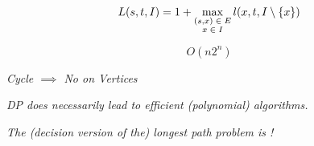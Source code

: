\begin{frame}{}
  \[
    L(s, t, I) = 1 + \max_{\substack{(s, x) \;\in\; E \\ x \;\in\; I}} l(x, t, I \setminus \left\{x\right\})
  \]

  \pause
  \[
    O(n 2^n)
  \]

  \pause
  \vspace{0.30cm}
  \begin{center}
    {\large \it Cycle $\implies$ No  on Vertices}

    \pause
    \vspace{0.60cm}
    {\large \it DP does  necessarily lead to efficient (polynomial) algorithms.}

    \pause
    \vspace{0.60cm}
    {\large \it The (decision version of the) longest path problem is !}
  \end{center}
\end{frame}
